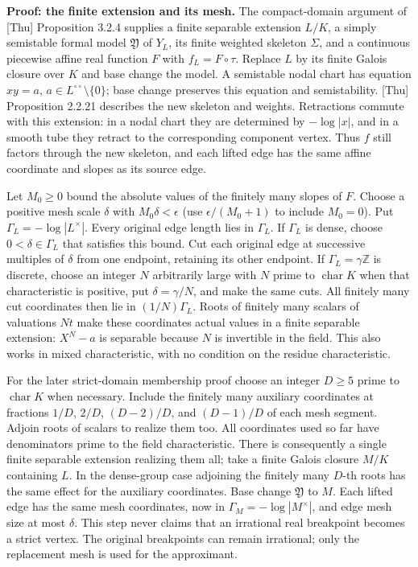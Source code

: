 \documentclass[
  11pt,
]{article}
\begin{document}
\textbf{Proof: the finite extension and its mesh.} The compact-domain
argument of {[}Thu{]} Proposition 3.2.4 supplies a finite separable
extension \(L/K\), a simply semistable formal model \(\mathfrak Y\) of
\(Y_L\), its finite weighted skeleton \(\Sigma\), and a continuous
piecewise affine real function \(F\) with \(f_L=F\circ\tau\). Replace
\(L\) by its finite Galois closure over \(K\) and base change the model.
A semistable nodal chart has equation \(xy=a\),
\(a\in L^{\circ\circ}\setminus\{0\}\); base change preserves this
equation and semistability. {[}Thu{]} Proposition 2.2.21 describes the
new skeleton and weights. Retractions commute with this extension: in a
nodal chart they are determined by \(-\log|x|\), and in a smooth tube
they retract to the corresponding component vertex. Thus \(f\) still
factors through the new skeleton, and each lifted edge has the same
affine coordinate and slopes as its source edge.

Let \(M_0\ge0\) bound the absolute values of the finitely many slopes of
\(F\). Choose a positive mesh scale \(\delta\) with
\(M_0\delta<\epsilon\) (use \(\epsilon/(M_0+1)\) to include \(M_0=0\)).
Put \(\Gamma_L=-\log|L^\times|\). Every original edge length lies in
\(\Gamma_L\). If \(\Gamma_L\) is dense, choose \(0<\delta\in\Gamma_L\)
that satisfies this bound. Cut each original edge at successive
multiples of \(\delta\) from one endpoint, retaining its other endpoint.
If \(\Gamma_L=\gamma\mathbb Z\) is discrete, choose an integer \(N\)
arbitrarily large with \(N\) prime to \(\operatorname{char}K\) when that
characteristic is positive, put \(\delta=\gamma/N\), and make the same
cuts. All finitely many cut coordinates then lie in \((1/N)\Gamma_L\).
Roots of finitely many scalars of valuations \(N t\) make these
coordinates actual values in a finite separable extension: \(X^N-a\) is
separable because \(N\) is invertible in the field. This also works in
mixed characteristic, with no condition on the residue characteristic.

For the later strict-domain membership proof choose an integer \(D\ge5\)
prime to \(\operatorname{char}K\) when necessary. Include the finitely
many auxiliary coordinates at fractions \(1/D\), \(2/D\), \((D-2)/D\),
and \((D-1)/D\) of each mesh segment. Adjoin roots of scalars to realize
them too. All coordinates used so far have denominators prime to the
field characteristic. There is consequently a single finite separable
extension realizing them all; take a finite Galois closure \(M/K\)
containing \(L\). In the dense-group case adjoining the finitely many
\(D\)-th roots has the same effect for the auxiliary coordinates. Base
change \(\mathfrak Y\) to \(M\). Each lifted edge has the same mesh
coordinates, now in \(\Gamma_M=-\log|M^\times|\), and edge mesh size at
most \(\delta\). This step never claims that an irrational real
breakpoint becomes a strict vertex. The original breakpoints can remain
irrational; only the replacement mesh is used for the approximant.
\end{document}
